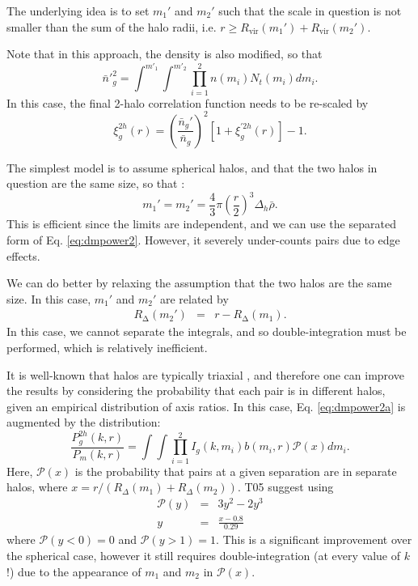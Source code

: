 \documentclass[5p]{elsarticle}
\begin{document}
The  underlying idea  is to set $m_1'$ and $m_2'$ such that the scale in question is not smaller than the sum of the halo radii, i.e. $r \ge R_\text{vir}(m_1') + R_\text{vir}(m_2')$. 

Note that in this approach, the density is also modified, so that
\begin{equation}
    \label{eq:ng2}
    \bar{n}'^{2}_g = \int^{m'_1} \int^{m'_2} \prod_{i=1}^2 n(m_i) N_t(m_i) dm_i.
\end{equation}
In this case, the final 2-halo correlation function needs to be re-scaled by
\begin{equation}
    \xi_g^{2h}(r) = \left(\frac{\bar{n}_g'}{\bar{n}_g}\right)^2\left[1+\xi_g^{'2h}(r)\right] - 1.
\end{equation}

The simplest model is to assume spherical halos, and that the two halos in question are the same size, so that  
\citep{Zheng2005}:
\begin{equation}
m_1' = m_2' = \frac{4}{3}\pi\left(\frac{r}{2}\right)^3\Delta_h \bar{\rho}.
\end{equation}
This is efficient since the limits are independent, and we can use the separated form of Eq.  \ref{eq:dmpower2}. However, it severely under-counts pairs due to edge effects. 

We can do better by relaxing the assumption that the two halos are the same size. In this case,  $m_1'$ and $m_2'$ are related by 
\begin{eqnarray}
    R_\mathrm{\Delta}(m_2') &=& r - R_\mathrm{\Delta}(m_1).
\end{eqnarray}
In this case, we cannot separate the integrals, and so double-integration must be performed, which is relatively inefficient.

It is well-known that halos are typically triaxial \citep{Bullock2001a,Taylor2011,Zemp2011}, and therefore one can improve the results by considering the probability that each pair is in different halos, given an empirical distribution of axis ratios. In this case, Eq. \ref{eq:dmpower2a} is augmented by the distribution:
\begin{equation}
    \frac{P_{g}^{2h}(k,r)}{ P_{m}(k,r)}=   \int \int \prod_{i=1}^2  I_g(k,m_i)b(m_i,r) \mathcal{P}(x) dm_i.
\end{equation}
Here, $\mathcal{P}(x)$ is the probability that pairs at a given separation are in separate halos, where $x=r/(R_{\Delta}(m_1) + R_{\Delta}(m_2))$. T05 suggest using
\begin{eqnarray}
    \mathcal{P}(y) &=& 3y^2 - 2y^3 \\
    y &=& \frac{x-0.8}{0.29}
\end{eqnarray}
where $\mathcal{P}(y<0) = 0$ and $\mathcal{P}(y>1) = 1$. This is a significant improvement over the spherical case, however it still requires double-integration (at every value of $k$!) due to the appearance of $m_1$ and $m_2$ in $\mathcal{P}(x)$. 
\end{document}
